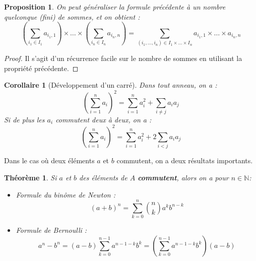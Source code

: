 \documentclass[french]{book}
\newcommand{\N}{\mathbb{N}}
\theoremstyle{plain}
\newtheorem{thm}{Théorème}[chapter]
\newtheorem{prop}{Proposition}[chapter]
\newtheorem{cor}{Corollaire}[chapter]
\theoremstyle{definition}
\theoremstyle{remark}
\begin{document}
\begin{prop}
	On peut généraliser la formule précédente à un nombre quelconque (fini) de sommes, et on obtient : $$\left(\sum_{i_1\in I_1}a_{i_1,1}\right)\times\ldots\times\left(\sum_{i_n\in I_n}a_{i_n,n}\right)=\sum_{(i_1,\ldots,i_n)\in I_1\times\ldots\times I_n}a_{i_1,1}\times\ldots\times a_{i_n,n}$$
\end{prop}
\begin{proof}
	Il s'agit d'un récurrence facile sur le nombre de sommes en utilisant la propriété précédente.
\end{proof}
\begin{cor}[Développement d'un carré]
	Dans tout anneau, on a : $$\left(\sum_{i=1}^{n}a_i\right)^2=\sum_{i=1}^{n}a_i^2+\sum_{i\ne j}a_ia_j$$ Si de plus les $a_i$ commutent deux à deux, on a : $$\left(\sum_{i=1}^{n}a_i\right)^2=\sum_{i=1}^{n}a_i^2+2\sum_{i<j}a_ia_j$$
\end{cor}
Dans le cas où deux éléments $a$ et $b$ commutent, on a deux résultats importants.
\begin{thm}
	Si $a$ et $b$ des éléments de $A$ \textbf{commutent}, alors on a pour $n\in\N$:
	\begin{itemize}
		\item Formule du binôme de Newton : $$(a+b)^n=\sum_{k=0}^{n}\binom{n}{k}a^kb^{n-k}$$
		\item Formule de Bernoulli : $$a^n-b^n=(a-b)\sum_{k=0}^{n-1}a^{n-1-k}b^k=\left(\sum_{k=0}^{n-1}a^{n-1-k}b^k\right)(a-b)$$
	\end{itemize}
\end{thm}
\end{document}
